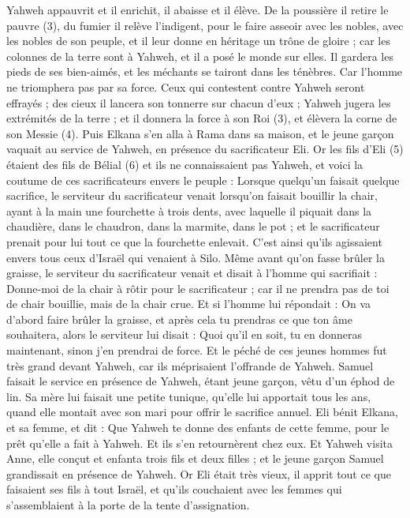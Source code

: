 \begin{multicols}{2}
Yahweh appauvrit et il enrichit, il abaisse et il élève.
De la poussière il retire le pauvre (3), du fumier il relève l’indigent, pour le faire asseoir avec les nobles, avec les nobles de son peuple, et il leur donne en héritage un trône de gloire ; car les colonnes de la terre sont à Yahweh, et il a posé le monde sur elles.
Il gardera les pieds de ses bien-aimés, et les méchants se tairont dans les ténèbres. Car l'homme ne triomphera pas par sa force.
Ceux qui contestent contre Yahweh seront effrayés ; des cieux il lancera son tonnerre sur chacun d'eux ; Yahweh jugera les extrémités de la terre ; et il donnera la force à son Roi (3), et élèvera la corne de son Messie (4).
Puis Elkana s'en alla à Rama dans sa maison, et le jeune garçon vaquait au service de Yahweh, en présence du sacrificateur Eli.
Or les fils d'Eli (5) étaient des fils de Bélial (6) et ils ne connaissaient pas Yahweh,
et voici la coutume de ces sacrificateurs envers le peuple : Lorsque quelqu'un faisait quelque sacrifice, le serviteur du sacrificateur venait lorsqu'on faisait bouillir la chair, ayant à la main une fourchette à trois dents,
avec laquelle il piquait dans la chaudière, dans le chaudron, dans la marmite, dans le pot ; et le sacrificateur prenait pour lui tout ce que la fourchette enlevait. C’est ainsi qu’ils agissaient envers tous ceux d'Israël qui venaient à Silo.
Même avant qu'on fasse brûler la graisse, le serviteur du sacrificateur venait et disait à l'homme qui sacrifiait : Donne-moi de la chair à rôtir pour le sacrificateur ; car il ne prendra pas de toi de chair bouillie, mais de la chair crue.
Et si l'homme lui répondait : On va d’abord faire brûler la graisse, et après cela tu prendras ce que ton âme souhaitera, alors le serviteur lui disait : Quoi qu'il en soit, tu en donneras maintenant, sinon j'en prendrai de force.
Et le péché de ces jeunes hommes fut très grand devant Yahweh, car ils méprisaient l’offrande de Yahweh.
Samuel faisait le service en présence de Yahweh, étant jeune garçon, vêtu d'un éphod de lin.
Sa mère lui faisait une petite tunique, qu'elle lui apportait tous les ans, quand elle montait avec son mari pour offrir le sacrifice annuel.
Eli bénit Elkana, et sa femme, et dit : Que Yahweh te donne des enfants de cette femme, pour le prêt qu’elle a fait à Yahweh. Et ils s'en retournèrent chez eux.
Et Yahweh visita Anne, elle conçut et enfanta trois fils et deux filles ; et le jeune garçon Samuel grandissait en présence de Yahweh.
Or Eli était très vieux, il apprit tout ce que faisaient ses fils à tout Israël, et qu'ils couchaient avec les femmes qui s'assemblaient à la porte de la tente d'assignation.

\end{multicols}
